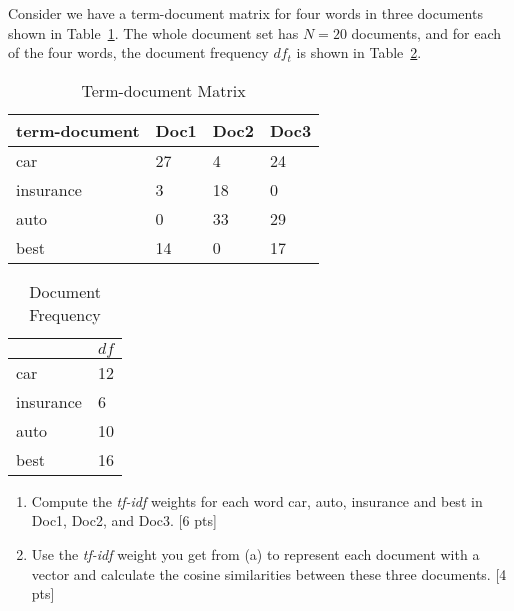 Consider we have a term-document matrix for four words in three documents shown in Table~\ref{Tab:term_doc}. The whole document set has $N = 20$ documents, and for each of the four words, the document frequency $df_t$ is shown in Table~\ref{Tab:doc_freq}.

\begin{table}[h]
\centering
\begin{tabular}{|l|l|l|l|}
\hline
term-document       & Doc1 & Doc2 & Doc3 \\ \hline
car       & 27   & 4    & 24   \\ \hline
insurance & 3    & 18   & 0    \\ \hline
auto      & 0    & 33   & 29   \\ \hline
best      & 14   & 0    & 17   \\ \hline
\end{tabular}\caption{Term-document Matrix} \label{Tab:term_doc}
\end{table}

\begin{table}[h]
\centering
\begin{tabular}{|l|l|}
\hline
          & $df$ \\ \hline
car       & 12 \\ \hline
insurance & 6  \\ \hline
auto      & 10 \\ \hline
best      & 16 \\ \hline
\end{tabular} \caption{Document Frequency} \label{Tab:doc_freq}
\end{table}

\begin{enumerate}
    \item Compute the \textit{tf-idf} weights for each word car, auto,
insurance and best in Doc1, Doc2, and Doc3.  [6 pts]
    \item Use the \textit{tf-idf} weight you get from (a) to represent each document with a vector and calculate the cosine similarities between these three documents. [4 pts]
\end{enumerate}

